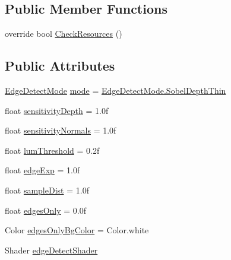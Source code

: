 \subsection*{Public Member Functions}
\begin{DoxyCompactItemize}
\item 
override bool \mbox{\hyperlink{class_unity_standard_assets_1_1_image_effects_1_1_edge_detection_ac72609e0a21d65869e4240c8511d8b83}{Check\+Resources}} ()
\end{DoxyCompactItemize}
\subsection*{Public Attributes}
\begin{DoxyCompactItemize}
\item 
\mbox{\hyperlink{class_unity_standard_assets_1_1_image_effects_1_1_edge_detection_a6da59c4041099c1f590eb1e4fc64d0b1}{Edge\+Detect\+Mode}} \mbox{\hyperlink{class_unity_standard_assets_1_1_image_effects_1_1_edge_detection_aba444f32988b872cf709946d75eefb6a}{mode}} = \mbox{\hyperlink{class_unity_standard_assets_1_1_image_effects_1_1_edge_detection_a6da59c4041099c1f590eb1e4fc64d0b1a98e5dbe639f7850feb04dce03f5744ee}{Edge\+Detect\+Mode.\+Sobel\+Depth\+Thin}}
\item 
float \mbox{\hyperlink{class_unity_standard_assets_1_1_image_effects_1_1_edge_detection_a0284f65303c62643e48d4df5971ca1d9}{sensitivity\+Depth}} = 1.\+0f
\item 
float \mbox{\hyperlink{class_unity_standard_assets_1_1_image_effects_1_1_edge_detection_abcada6169dbaee43b868d7ca30c200eb}{sensitivity\+Normals}} = 1.\+0f
\item 
float \mbox{\hyperlink{class_unity_standard_assets_1_1_image_effects_1_1_edge_detection_a64a02522a743c2ea329076ceed0199b9}{lum\+Threshold}} = 0.\+2f
\item 
float \mbox{\hyperlink{class_unity_standard_assets_1_1_image_effects_1_1_edge_detection_a077fdb63102170684248bb7e4156e0bd}{edge\+Exp}} = 1.\+0f
\item 
float \mbox{\hyperlink{class_unity_standard_assets_1_1_image_effects_1_1_edge_detection_a57b1200f59628f5eb4ae3edda6e4d433}{sample\+Dist}} = 1.\+0f
\item 
float \mbox{\hyperlink{class_unity_standard_assets_1_1_image_effects_1_1_edge_detection_a4690f3058d1202ede950b77f76e7a1de}{edges\+Only}} = 0.\+0f
\item 
Color \mbox{\hyperlink{class_unity_standard_assets_1_1_image_effects_1_1_edge_detection_adf6fcab3d2b0feb09e7fee606fcfe815}{edges\+Only\+Bg\+Color}} = Color.\+white
\item 
Shader \mbox{\hyperlink{class_unity_standard_assets_1_1_image_effects_1_1_edge_detection_a5b16193ceaa3c8c019ebf3ac78253c00}{edge\+Detect\+Shader}}
\end{DoxyCompactItemize}
